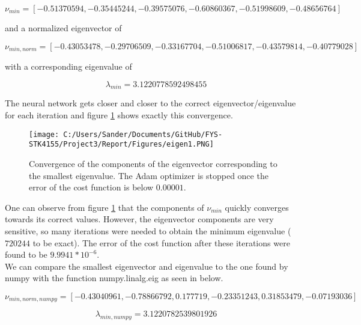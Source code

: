 \documentclass[12pt,a4paper]{article}
\begin{document}
\begin{equation}\label{eq:minEigenVec}
\nu_{min}=[-0.51370594, -0.35445244, -0.39575076, -0.60860367, -0.51998609, -0.48656764]
\end{equation}

\noindent and a normalized eigenvector of

\begin{equation}\label{eq:minEigenVecNorm}
\nu_{min, norm}=[-0.43053478, -0.29706509, -0.33167704, -0.51006817, -0.43579814, -0.40779028]
\end{equation}

\noindent with a corresponding eigenvalue of 

\begin{equation}\label{eq:minEigenVal}
\lambda_{min} = 3.1220778592498455
\end{equation}

\noindent The neural network gets closer and closer to the correct eigenvector/eigenvalue for each iteration and figure \ref{fig:eigen1} shows exactly this convergence.

\begin{figure}[H]
\centering
\texttt{[image: C:/Users/Sander/Documents/GitHub/FYS-STK4155/Project3/Report/Figures/eigen1.PNG]}
\caption{\label{fig:eigen1} Convergence of the components of the eigenvector corresponding to the smallest eigenvalue. The Adam optimizer is stopped once the error of the cost function is below $0.00001$.}
\end{figure}

\noindent One can observe from figure \ref{fig:eigen1} that the components of $\nu_{min}$ quickly converges towards its correct values. However, the eigenvector components are very sensitive, so many iterations were needed to obtain the minimum eigenvalue ($720244$ to be exact). The error of the cost function after these iterations were found to be $9.9941 *10^{-6}$.
\\
We can compare the smallest eigenvector and eigenvalue to the one found by numpy with the function numpy.linalg.eig as seen in below.

\begin{equation}\label{eq:numpyEigenVec}
\nu_{min,norm,numpy} = [-0.43040961, -0.78866792, 0.177719, -0.23351243, 0.31853479, -0.07193036]
\end{equation}

\begin{equation}\label{eq:numpyEigenVal}
\lambda_{min,numpy} = 3.1220782539801926
\end{equation}
\end{document}
